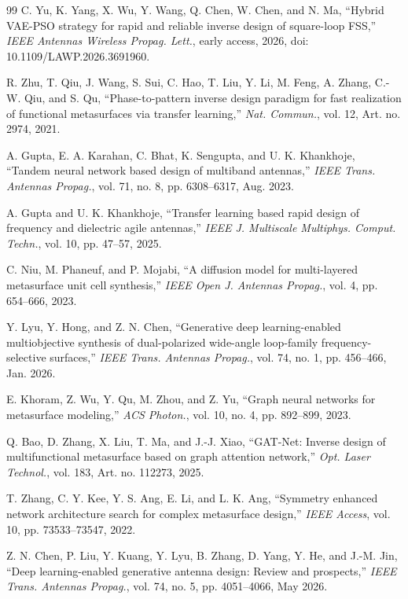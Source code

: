 \documentclass[journal]{IEEEtran}
\begin{document}
\begin{thebibliography}{99}
 C. Yu, K. Yang, X. Wu, Y. Wang, Q. Chen, W. Chen, and N. Ma, ``Hybrid VAE-PSO strategy for rapid and reliable inverse design of square-loop FSS,'' \textit{IEEE Antennas Wireless Propag. Lett.}, early access, 2026, doi: 10.1109/LAWP.2026.3691960.

 R. Zhu, T. Qiu, J. Wang, S. Sui, C. Hao, T. Liu, Y. Li, M. Feng, A. Zhang, C.-W. Qiu, and S. Qu, ``Phase-to-pattern inverse design paradigm for fast realization of functional metasurfaces via transfer learning,'' \textit{Nat. Commun.}, vol. 12, Art. no. 2974, 2021.

 A. Gupta, E. A. Karahan, C. Bhat, K. Sengupta, and U. K. Khankhoje, ``Tandem neural network based design of multiband antennas,'' \textit{IEEE Trans. Antennas Propag.}, vol. 71, no. 8, pp. 6308--6317, Aug. 2023.

 A. Gupta and U. K. Khankhoje, ``Transfer learning based rapid design of frequency and dielectric agile antennas,'' \textit{IEEE J. Multiscale Multiphys. Comput. Techn.}, vol. 10, pp. 47--57, 2025.

 C. Niu, M. Phaneuf, and P. Mojabi, ``A diffusion model for multi-layered metasurface unit cell synthesis,'' \textit{IEEE Open J. Antennas Propag.}, vol. 4, pp. 654--666, 2023.

 Y. Lyu, Y. Hong, and Z. N. Chen, ``Generative deep learning-enabled multiobjective synthesis of dual-polarized wide-angle loop-family frequency-selective surfaces,'' \textit{IEEE Trans. Antennas Propag.}, vol. 74, no. 1, pp. 456--466, Jan. 2026.

 E. Khoram, Z. Wu, Y. Qu, M. Zhou, and Z. Yu, ``Graph neural networks for metasurface modeling,'' \textit{ACS Photon.}, vol. 10, no. 4, pp. 892--899, 2023.

 Q. Bao, D. Zhang, X. Liu, T. Ma, and J.-J. Xiao, ``GAT-Net: Inverse design of multifunctional metasurface based on graph attention network,'' \textit{Opt. Laser Technol.}, vol. 183, Art. no. 112273, 2025.

 T. Zhang, C. Y. Kee, Y. S. Ang, E. Li, and L. K. Ang, ``Symmetry enhanced network architecture search for complex metasurface design,'' \textit{IEEE Access}, vol. 10, pp. 73533--73547, 2022.

 Z. N. Chen, P. Liu, Y. Kuang, Y. Lyu, B. Zhang, D. Yang, Y. He, and J.-M. Jin, ``Deep learning-enabled generative antenna design: Review and prospects,'' \textit{IEEE Trans. Antennas Propag.}, vol. 74, no. 5, pp. 4051--4066, May 2026.


\end{thebibliography}
\end{document}
